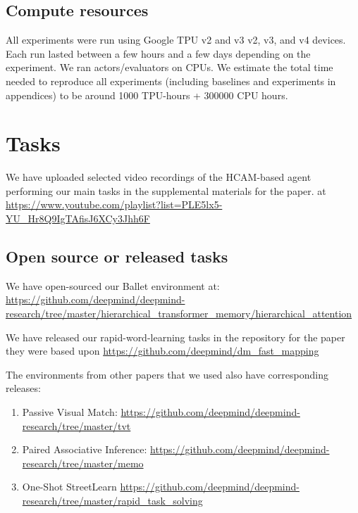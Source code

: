 \subsection{Compute resources}
All experiments were run using Google TPU 
\ifanonymized
  v2 and v3
\else
  v2, v3, and v4
\fi
devices. Each run lasted between a few hours and a few days depending on the experiment. We ran actors/evaluators on CPUs. We estimate the total time needed to reproduce all experiments (including baselines and experiments in appendices) to be around 1000 TPU-hours + 300000 CPU hours.

\section{Tasks} \label{app:tasks}

We have uploaded selected video recordings of the HCAM-based agent performing our main tasks 
\ifanonymized
in the supplemental materials for the paper.
\else
at \url{https://www.youtube.com/playlist?list=PLE5lx5-YU_Hr8Q9IgTAfisJ6XCy3Jhh6F}
\fi

\subsection{Open source or released tasks}

We have open-sourced our Ballet environment at: \url{https://github.com/deepmind/deepmind-research/tree/master/hierarchical_transformer_memory/hierarchical_attention}

We have released our rapid-word-learning tasks in the repository for the paper they were based upon \url{https://github.com/deepmind/dm_fast_mapping}

The environments from other papers that we used also have corresponding releases:
\begin{enumerate}
    \item Passive Visual Match: \url{https://github.com/deepmind/deepmind-research/tree/master/tvt}
    \item Paired Associative Inference: \url{https://github.com/deepmind/deepmind-research/tree/master/memo}
    \item One-Shot StreetLearn \url{https://github.com/deepmind/deepmind-research/tree/master/rapid_task_solving}
\end{enumerate}


